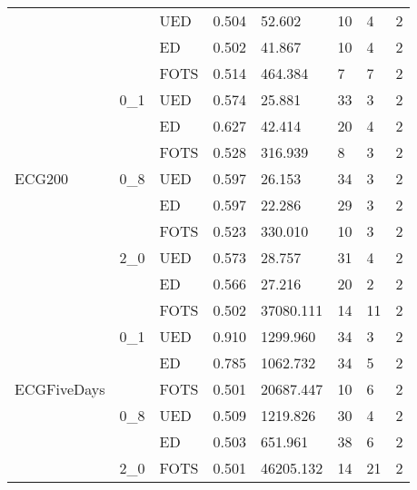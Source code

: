 \begin{tabular}{llllllll}
           &     & UED & 0.504 &    52.602 &             10 &            4 &           2 \\
           &     & ED & 0.502 &    41.867 &             10 &            4 &           2 \\
\cline{1-8}
\cline{2-8}
\multirow{9}{*}{ECG200} & \multirow{3}{*}{0\_1} & FOTS & 0.514 &   464.384 &              7 &            7 &           2 \\
           &     & UED & 0.574 &    25.881 &             33 &            3 &           2 \\
           &     & ED & 0.627 &    42.414 &             20 &            4 &           2 \\
\cline{2-8}
           & \multirow{3}{*}{0\_8} & FOTS & 0.528 &   316.939 &              8 &            3 &           2 \\
           &     & UED & 0.597 &    26.153 &             34 &            3 &           2 \\
           &     & ED & 0.597 &    22.286 &             29 &            3 &           2 \\
\cline{2-8}
           & \multirow{3}{*}{2\_0} & FOTS & 0.523 &   330.010 &             10 &            3 &           2 \\
           &     & UED & 0.573 &    28.757 &             31 &            4 &           2 \\
           &     & ED & 0.566 &    27.216 &             20 &            2 &           2 \\
\cline{1-8}
\cline{2-8}
\multirow{9}{*}{ECGFiveDays} & \multirow{3}{*}{0\_1} & FOTS & 0.502 & 37080.111 &             14 &           11 &           2 \\
           &     & UED & 0.910 &  1299.960 &             34 &            3 &           2 \\
           &     & ED & 0.785 &  1062.732 &             34 &            5 &           2 \\
\cline{2-8}
           & \multirow{3}{*}{0\_8} & FOTS & 0.501 & 20687.447 &             10 &            6 &           2 \\
           &     & UED & 0.509 &  1219.826 &             30 &            4 &           2 \\
           &     & ED & 0.503 &   651.961 &             38 &            6 &           2 \\
\cline{2-8}
           & \multirow{3}{*}{2\_0} & FOTS & 0.501 & 46205.132 &             14 &           21 &           2 \\

\end{tabular}
